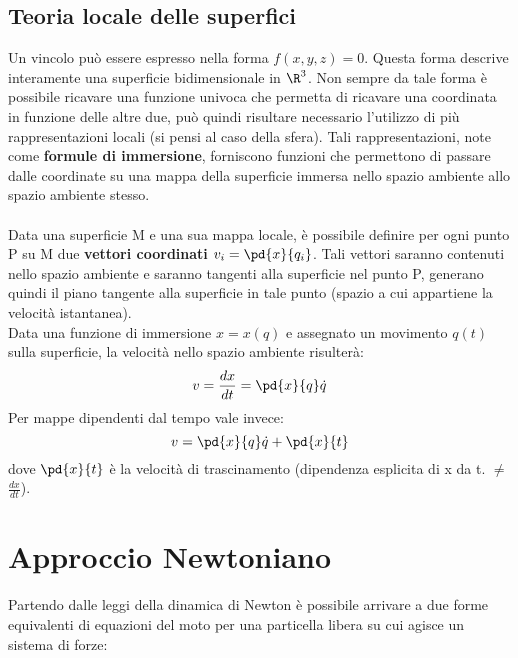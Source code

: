 \documentclass{article}
\begin{document}
\subsection{Teoria locale delle superfici}
Un vincolo può essere espresso nella forma $f(x,y,z)=0$. Questa forma descrive interamente una superficie bidimensionale in $\R^3$.
Non sempre da tale forma è possibile ricavare una funzione univoca che permetta di ricavare una coordinata in funzione delle altre due, può quindi risultare necessario l'utilizzo di più rappresentazioni locali (si pensi al caso della sfera). Tali rappresentazioni, note come \textbf{formule di immersione}, forniscono funzioni che permettono di passare dalle coordinate su una mappa della superficie immersa nello spazio ambiente allo spazio ambiente stesso.\\\\
Data una superficie M e una sua mappa locale, è possibile definire per ogni punto P su M due \textbf{vettori coordinati} $v_i=\pd{x}{q_i}$. Tali vettori saranno contenuti nello spazio ambiente e saranno tangenti alla superficie nel punto P, generano quindi il piano tangente alla superficie in tale punto (spazio a cui appartiene la velocità istantanea).\\
Data una funzione di immersione $x=x(q)$ e assegnato un movimento $q(t)$ sulla superficie, la velocità nello spazio ambiente risulterà:
$$ v=\frac{dx}{dt}=\pd{x}{q}\dot q $$
Per mappe dipendenti dal tempo vale invece:
 $$ v=\pd{x}{q}\dot q + \pd{x}{t} $$
 dove $\pd{x}{t}$ è la velocità di trascinamento (dipendenza esplicita di x da t. $\neq$ $\frac{dx}{dt}$).





\newpage
\section{Approccio Newtoniano}
Partendo dalle leggi della dinamica di Newton è possibile arrivare a due forme equivalenti di equazioni del moto per una particella libera su cui agisce un sistema di forze:
\end{document}
